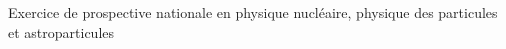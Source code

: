 \documentclass[12pt]{article}
\begin{document}
\begin{raggedright} 
  \large
  Exercice de prospective nationale en physique nucléaire, physique des particules et astroparticules\hfill ~ \linebreak
\end{raggedright}
\normalsize

\vspace{1cm}



%
\end{document}
